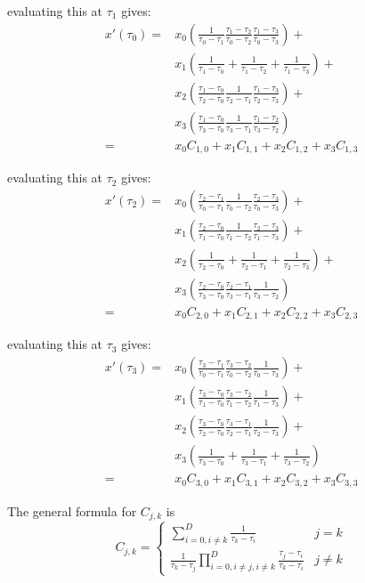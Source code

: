 \documentclass[a4paper,12pt]{article}
\newcommand{\taus}[3]{\frac{\tau_{#1}-\tau_{#2}}{\tau_{#3}-\tau_{#2}}}
\newcommand{\taud}[3]{\frac{1}{\tau_{#3}-\tau_{#2}}}
\begin{document}
evaluating this at $\tau_1$ gives:
\begin{align}
x'(\tau_0) = &x_0 (\taud{1}{1}{0} \taus{1}{2}{0} \taus{1}{3}{0}) +\\
             &x_1 (\taud{1}{0}{1}
                 + \taud{1}{2}{1}
                 + \taud{1}{3}{1}) +\\
             &x_2 (\taus{1}{0}{2} \taud{1}{1}{2} \taus{1}{3}{2}) +\\
             &x_3 ( \taus{1}{0}{3} \taud{1}{1}{3} \taus{1}{2}{3}) \\
= & x_0 C_{1,0} + x_1 C_{1,1} + x_2 C_{1,2} + x_3 C_{1,3}
\end{align}

evaluating this at $\tau_2$ gives:
\begin{align}
x'(\tau_2) = &x_0 (\taus{2}{1}{0} \taud{2}{2}{0} \taus{2}{3}{0}) + \\
             &x_1 (\taus{2}{0}{1} \taud{2}{2}{1} \taus{2}{3}{1}) + \\
             &x_2 (\taud{2}{0}{2}
                 + \taud{2}{1}{2}
                 + \taud{2}{3}{2}) + \\
             &x_3 (\taus{2}{0}{3} \taus{2}{1}{3} \taud{2}{2}{3}) \\
= & x_0 C_{2,0} + x_1 C_{2,1} + x_2 C_{2,2} + x_3 C_{2,3}
\end{align}

evaluating this at $\tau_3$ gives:
\begin{align}
x'(\tau_3) = &x_0 (\taus{3}{1}{0} \taus{3}{2}{0} \taud{3}{3}{0}) + \\
             &x_1 (\taus{3}{0}{1} \taus{3}{2}{1} \taud{3}{3}{1}) + \\
             &x_2 (\taus{3}{0}{2} \taus{3}{1}{2} \taud{3}{3}{2}) + \\
             &x_3 (\taud{3}{0}{3} 
                 + \taud{3}{1}{3} 
                 + \taud{3}{2}{3}) \\
= & x_0 C_{3,0} + x_1 C_{3,1} + x_2 C_{3,2} + x_3 C_{3,3}
\end{align}

The general formula for $C_{j,k}$ is
\begin{equation}
C_{j,k} =
\begin{cases}
\sum_{i=0,i\ne k}^D{\frac{1}{\tau_k-\tau_i}} & j=k \\
\frac{1}{\tau_k-\tau_j} \prod_{i=0,i\ne j,i\ne k}^D{\frac{\tau_j-\tau_i}{\tau_k-\tau_i}}  & j \ne k
\end{cases}
\end{equation}
\end{document}
